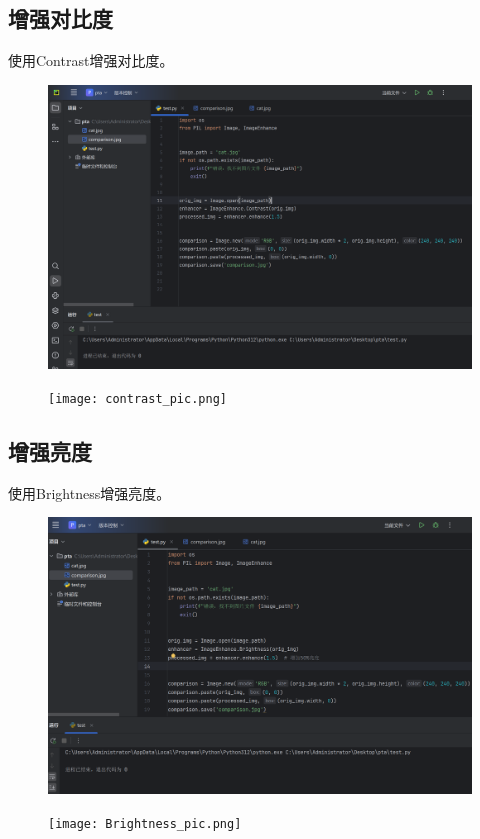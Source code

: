 \documentclass{article}
\begin{document}
\subsection{增强对比度}
使用Contrast增强对比度。
\begin{figure}[H]
    \centering
    \includegraphics[width=1\linewidth]{contrast_code.png}
\end{figure}
\begin{figure}[H]
    \centering
    \texttt{[image: contrast\_pic.png]}
\end{figure}


\newpage
\subsection{增强亮度}
使用Brightness增强亮度。
\begin{figure}[H]
    \centering
    \includegraphics[width=1\linewidth]{brightness_code.png}
\end{figure}
\begin{figure}[H]
    \centering
    \texttt{[image: Brightness\_pic.png]}
\end{figure}
\end{document}
